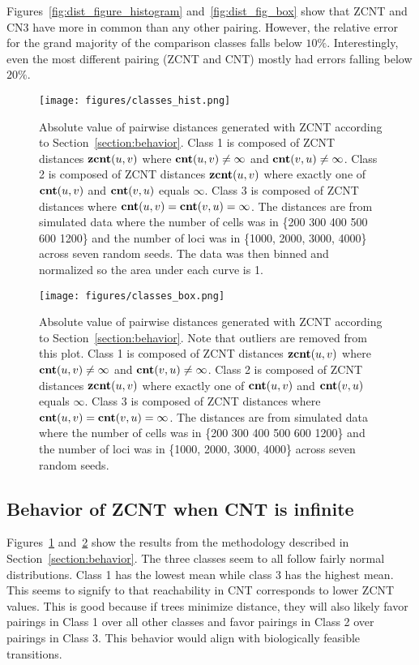 Figures~\ref{fig:dist_figure_histogram} and~\ref{fig:dist_fig_box} show that ZCNT and CN3 have more in common than any other pairing. However, the relative error for the grand majority of the comparison classes falls below $10\%$. Interestingly, even the most different pairing (ZCNT and CNT) mostly had errors falling below $20\%$. 

\begin{figure}[ht]
    \centering
    \texttt{[image: figures/classes\_hist.png]}
    \caption{Absolute value of pairwise distances generated with ZCNT according to Section~\ref{section:behavior}. Class 1 is composed of ZCNT distances $\textbf{zcnt}(u, v)$ where $\textbf{cnt}(u, v) \neq \infty$ and $\textbf{cnt}(v, u) \neq \infty$. Class 2 is composed of ZCNT distances $\textbf{zcnt}(u, v)$ where exactly one of $\textbf{cnt}(u, v)$ and $\textbf{cnt}(v, u)$ equals $\infty$. Class 3 is composed of ZCNT distances where $\textbf{cnt}(u, v) = \textbf{cnt}(v, u) = \infty$. The distances are from simulated data where the number of cells was in \{200 300 400 500 600 1200\} and the number of loci was in \{1000, 2000, 3000, 4000\} across seven random seeds. The data was then binned and normalized so the area under each curve is 1.}\label{fig:classes_hist}
\end{figure}

\begin{figure}[ht]
    \centering
    \texttt{[image: figures/classes\_box.png]}
    \caption{Absolute value of pairwise distances generated with ZCNT according to Section~\ref{section:behavior}. Note that outliers are removed from this plot. Class 1 is composed of ZCNT distances $\textbf{zcnt}(u, v)$ where $\textbf{cnt}(u, v) \neq \infty$ and $\textbf{cnt}(v, u) \neq \infty$. Class 2 is composed of ZCNT distances $\textbf{zcnt}(u, v)$ where exactly one of $\textbf{cnt}(u, v)$ and $\textbf{cnt}(v, u)$ equals $\infty$. Class 3 is composed of ZCNT distances where $\textbf{cnt}(u, v) = \textbf{cnt}(v, u) = \infty$. The distances are from simulated data where the number of cells was in \{200 300 400 500 600 1200\} and the number of loci was in \{1000, 2000, 3000, 4000\} across seven random seeds.}\label{fig:classes_box}
\end{figure}

\subsection{Behavior of ZCNT when CNT is infinite}\label{section:behavior_res}

Figures~\ref{fig:classes_hist} and~\ref{fig:classes_box} show the results from the methodology described in Section~\ref{section:behavior}. The three classes seem to all follow fairly normal distributions. Class 1 has the lowest mean while class 3 has the highest mean. This seems to signify to that reachability in CNT corresponds to lower ZCNT values. This is good because if trees minimize distance, they will also likely favor pairings in Class 1 over all other classes and favor pairings in Class 2 over pairings in Class 3. This behavior would align with biologically feasible transitions. 

